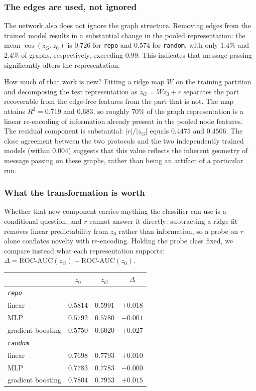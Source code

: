 \subsubsection{The edges are used, not ignored}
The network also does not ignore the graph structure. Removing edges from the trained model results in a substantial change in the pooled representation: the mean $\cos(z_G, z_0)$ is $0.726$ for \texttt{repo} and $0.574$ for \texttt{random}, with only $1.4\%$ and $2.4\%$ of graphs, respectively, exceeding $0.99$. This indicates that message passing significantly alters the representation.

How much of that work is new? Fitting a ridge map $W$ on the training partition and decomposing the test representation as $z_G = W z_0 + r$ separates the part recoverable from the edge-free features from the part that is not. The map attains $R^2 = 0.719$ and $0.683$, so roughly $70\%$ of the graph representation
is a linear re-encoding of information already present in the pooled node features. The residual component is substantial: $|r| / |z_G|$ equals $0.4475$ and $0.4506$. The close agreement between the two protocols and the two independently trained models (within $0.004$) suggests that this value reflects the inherent geometry of message passing on these graphs, rather than being an artifact of a particular run.

\subsubsection{What the transformation is worth}
Whether that new component carries anything the classifier can use is a conditional question, and $r$ cannot answer it directly: subtracting a ridge fit removes linear predictability from $z_0$ rather than information, so a probe on $r$ alone conflates novelty with re-encoding. Holding the probe class fixed, we compare instead what each representation supports: $\Delta = \text{ROC-AUC}(z_G) - \text{ROC-AUC}(z_0)$.

\begin{center}
\begin{tabular}{lccc}
\toprule
& $z_0$ & $z_G$ & $\Delta$ \\
\midrule
\multicolumn{4}{l}{\emph{\texttt{repo}}} \\
linear             & $0.5814$ & $0.5991$ & $+0.018$ \\
MLP                & $0.5792$ & $0.5780$ & $-0.001$ \\
gradient boosting  & $0.5750$ & $0.6020$ & $+0.027$ \\
\midrule
\multicolumn{4}{l}{\emph{\texttt{random}}} \\
linear             & $0.7698$ & $0.7793$ & $+0.010$ \\
MLP                & $0.7783$ & $0.7783$ & $-0.000$ \\
gradient boosting  & $0.7804$ & $0.7953$ & $+0.015$ \\
\bottomrule
\end{tabular}
\end{center}

